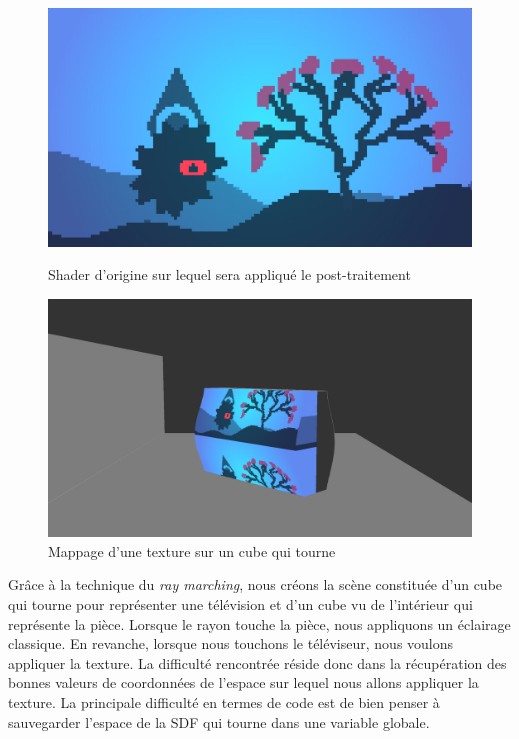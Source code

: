 \begin{figure}[h]
  \begin{minipage}[b]{0.45\linewidth}
    \centering
    \includegraphics[width=\linewidth]{images/shaders/mapuv01.png}
    \caption{Shader d'origine sur lequel sera appliqué le post-traitement}
    \label{mapuv01}
  \end{minipage}
  \hspace{0.1\linewidth} %
  \begin{minipage}[b]{0.45\linewidth}
    \centering
    \includegraphics[width=\linewidth]{images/shaders/mapuv00.png}
    \caption{Mappage d'une texture sur un cube qui tourne}
    \label{mapuv00}
  \end{minipage}
\end{figure}


Grâce à la technique du  \textit{ray marching}, nous créons la scène constituée d'un cube qui tourne pour représenter une télévision et d'un cube vu de l'intérieur qui représente la pièce. Lorsque le rayon touche la pièce, nous appliquons un éclairage classique. En revanche, lorsque nous touchons le téléviseur, nous voulons appliquer la texture. La difficulté rencontrée réside donc dans la récupération des bonnes valeurs de coordonnées de l'espace sur lequel nous allons appliquer la texture. La principale difficulté en termes de code est de bien penser à sauvegarder l'espace de la SDF qui tourne dans une variable globale.

